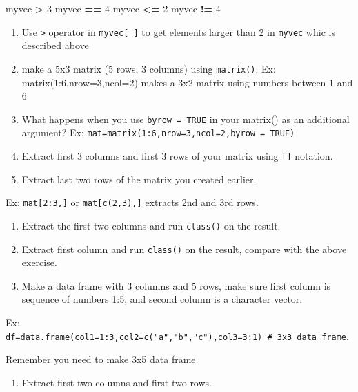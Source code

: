 \documentclass[12pt,]{krantz}
\newenvironment{Shaded}{\begin{snugshade}}{\end{snugshade}}
\newcommand{\DecValTok}[1]{\textcolor[rgb]{0.00,0.00,0.81}{#1}}
\newcommand{\NormalTok}[1]{#1}
\newcommand{\OperatorTok}[1]{\textcolor[rgb]{0.81,0.36,0.00}{\textbf{#1}}}
\newcommand{\StringTok}[1]{\textcolor[rgb]{0.31,0.60,0.02}{#1}}
\providecommand{\tightlist}{%
  \setlength{\itemsep}{0pt}\setlength{\parskip}{0pt}}
\begin{document}
\begin{Shaded}
\begin{Highlighting}[]
\NormalTok{myvec }\OperatorTok{>}\StringTok{ }\DecValTok{3}
\NormalTok{myvec }\OperatorTok{==}\StringTok{ }\DecValTok{4}
\NormalTok{myvec }\OperatorTok{<=}\StringTok{ }\DecValTok{2}
\NormalTok{myvec }\OperatorTok{!=}\StringTok{ }\DecValTok{4}
\end{Highlighting}
\end{Shaded}

\begin{enumerate}
\def\labelenumi{\arabic{enumi}.}
\setcounter{enumi}{18}
\item
  Use \texttt{\textgreater{}} operator in \texttt{myvec{[}\ {]}} to get elements larger than 2 in \texttt{myvec} whic is described above
\item
  make a 5x3 matrix (5 rows, 3 columns) using \texttt{matrix()}.
  Ex: matrix(1:6,nrow=3,ncol=2) makes a 3x2 matrix using numbers between 1 and 6
\item
  What happens when you use \texttt{byrow\ =\ TRUE} in your matrix() as an additional argument?
  Ex: \texttt{mat=matrix(1:6,nrow=3,ncol=2,byrow\ =\ TRUE)}
\item
  Extract first 3 columns and first 3 rows of your matrix using \texttt{{[}{]}} notation.
\item
  Extract last two rows of the matrix you created earlier.
\end{enumerate}

Ex: \texttt{mat{[}2:3,{]}} or \texttt{mat{[}c(2,3),{]}} extracts 2nd and 3rd rows.

\begin{enumerate}
\def\labelenumi{\arabic{enumi}.}
\setcounter{enumi}{23}
\item
  Extract the first two columns and run \texttt{class()} on the result.
\item
  Extract first column and run \texttt{class()} on the result, compare with the above exercise.
\item
  Make a data frame with 3 columns and 5 rows, make sure first column is sequence
  of numbers 1:5, and second column is a character vector.
\end{enumerate}

Ex: \texttt{df=data.frame(col1=1:3,col2=c("a","b","c"),col3=3:1)\ \#\ 3x3\ data\ frame}.

Remember you need to make 3x5 data frame

\begin{enumerate}
\def\labelenumi{\arabic{enumi}.}
\setcounter{enumi}{26}
\tightlist
\item
  Extract first two columns and first two rows.
\end{enumerate}
\end{document}
